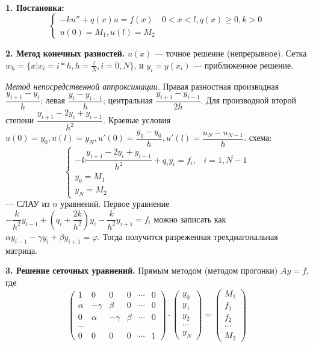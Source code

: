 \documentclass[9pt]{article}
\begin{document}
\ 
\par\textbf{1. Постановка:} 
\[\left\{\begin{array}{ll}
    -ku''+q(x)u=f(x) & 0<x<l,q(x)\ge0,k>0 \\
    u(0)=M_1,u(l)=M_2 & 
\end{array}\right.\]
\par\textbf{2. Метод конечных разностей.} \(u(x)\) --- точное решение (непрерывное). Сетка \(w_h=\{x|x_i=i*h,h=\frac{l}{N},i=\overline{0,N}\}\), и \(y_i=y(x_i)\) --- приближенное решение.
\par\textit{Метод непосредственной аппроксимации.} Правая разностная производная \(\dfrac{y_{i+1}-y_i}{h}\); левая \(\dfrac{y_i-y_{i-1}}{h}\); центральная \(\dfrac{y_{i+1}-y_{i-1}}{2h}\). Для производной второй степени \(\dfrac{y_{i+1}-2y_i+y_{i-1}}{h^2}\). Краевые условия \(u(0)=y_0,u(l)=y_N,u'(0)=\dfrac{y_1-y_0}{h},u'(l)=\dfrac{u_N-u_{N-1}}{h}\).  схема:
\[\left\{\begin{array}{ll}
    -k\dfrac{y_{i+1}-2y_i+y_{i-1}}{h^2}+q_iy_i=f_i, & i=\overline{1,N-1} \\
    y_0=M_1 \\
    y_N=M_2
\end{array}\right.\]
--- СЛАУ из $n$ уравнений. Первое уравнение \(-\dfrac{k}{h^2}y_{i-1}+(q_i+\dfrac{2k}{h^2})y_i-\dfrac{k}{h^2}y_{i+1}=f_i\) можно записать как \(\alpha y_{i-1}-\gamma y_i+\beta y_{i+1}=\varphi\). Тогда получится разреженная трехдиагональная матрица.
\par\textbf{3. Решение сеточных уравнений.} Прямым методом (методом прогонки) \(Ay=f\), где \[\left(
\begin{array}{cccccc}
    1 & 0 & 0 & 0 & \cdots & 0 \\
    \alpha & -\gamma & \beta & 0 & \cdots & 0 \\
    0 & \alpha & -\gamma & \beta & \cdots & 0 \\
    \cdots \\
    0 & 0 & 0 & 0 & \cdots & 1
\end{array}\right)\cdot\left(
\begin{array}{l}
    y_0 \\
    y_1 \\
    y_2 \\
    \cdots \\
    y_N
\end{array}
\right)=\left(
\begin{array}{l}
    M_1 \\
    f_1 \\ 
    f_2 \\
    \cdots \\
    M_2
\end{array}
\right)\]
\end{document}
